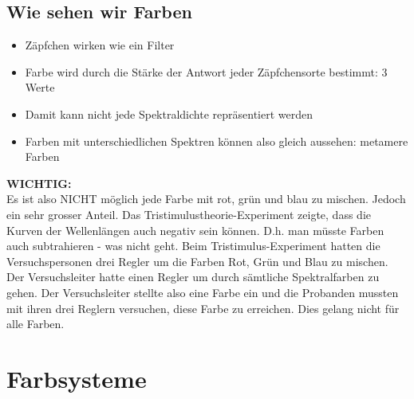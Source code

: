   
\subsection{Wie sehen wir Farben}
\begin{itemize}
    \item Zäpfchen wirken wie ein Filter
    \item Farbe wird durch die Stärke der Antwort jeder Zäpfchensorte bestimmt: 3 Werte
    \item Damit kann nicht jede Spektraldichte repräsentiert werden
    \item Farben mit unterschiedlichen Spektren können also gleich aussehen: metamere Farben
\end{itemize}
\noindent
\textbf{WICHTIG:}\\Es ist also NICHT möglich jede Farbe mit rot, grün und blau zu mischen. Jedoch ein sehr grosser Anteil.
Das Tristimulustheorie-Experiment zeigte, dass die Kurven der Wellenlängen auch negativ sein können. D.h. man müsste Farben auch subtrahieren - was nicht geht. Beim Tristimulus-Experiment hatten die Versuchspersonen drei Regler um die Farben Rot, Grün und Blau zu mischen. Der Versuchsleiter hatte einen Regler um durch sämtliche Spektralfarben zu gehen. Der Versuchsleiter stellte also eine Farbe ein und die Probanden mussten mit ihren drei Reglern versuchen, diese Farbe zu erreichen. Dies gelang nicht für alle Farben.

\clearpage
\section{Farbsysteme}
